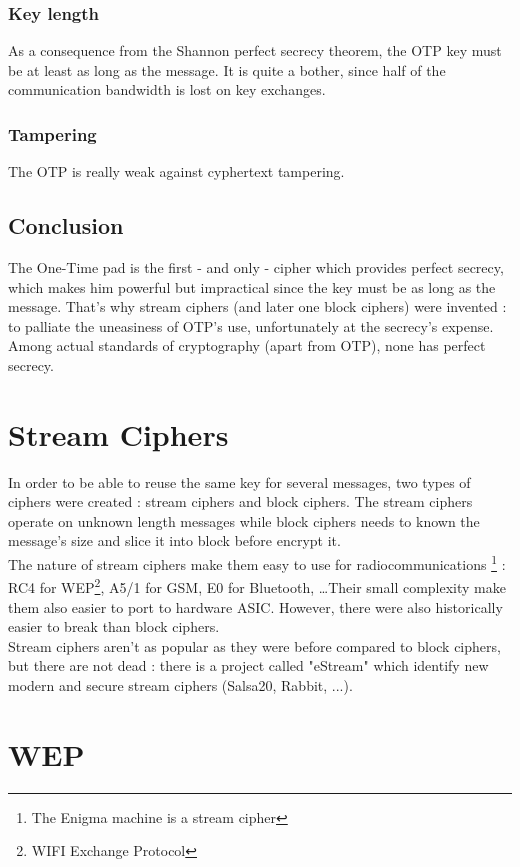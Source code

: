 \subsubsection{Key length}
As a consequence from the Shannon perfect secrecy theorem, the OTP key must be at least as long as the message. It is quite a bother, since half of the communication bandwidth is lost on key exchanges.

\subsubsection{Tampering}
The OTP is really weak against cyphertext tampering.

\subsection{Conclusion}

The One-Time pad is the first - and only - cipher which provides perfect secrecy, which makes him powerful but impractical since the key must be as long as the message. That's why stream ciphers (and later one block ciphers) were invented : to palliate the uneasiness of OTP's use, unfortunately at the secrecy's expense. Among actual standards of cryptography (apart from OTP), none has perfect secrecy. 

\section{ Stream Ciphers }

In order to be able to reuse the same key for several messages, two types of ciphers were created : stream ciphers and block ciphers. The stream ciphers operate on unknown length messages while block ciphers needs to known the message's size and slice it into block before encrypt it.\\
The nature of stream ciphers make them easy to use for radiocommunications \footnote{The Enigma machine is a stream cipher} : RC4 for WEP\footnote{WIFI Exchange Protocol}, A5/1 for GSM, E0 for Bluetooth, \dots Their small complexity make them also easier to port to hardware ASIC. However, there were also historically easier to break than block ciphers.\\
Stream ciphers aren't as popular as they were before compared to block ciphers, but there are not dead : there is a project called "eStream" which identify new modern and secure stream ciphers (Salsa20, Rabbit, ...). 

\section{WEP}

